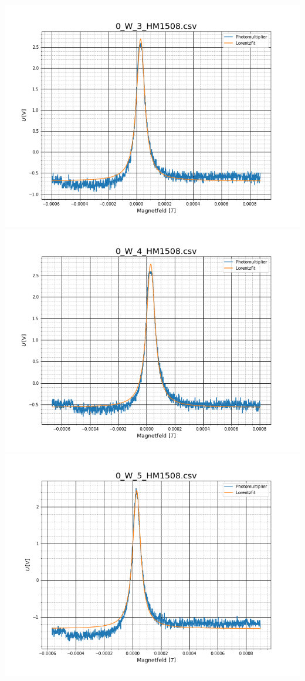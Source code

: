 \includegraphics[scale=0.3]{Bild/Anhang/Erwarmung/erw4}\\
\includegraphics[scale=0.3]{Bild/Anhang/Erwarmung/erw5}
\includegraphics[scale=0.3]{Bild/Anhang/Erwarmung/erw6}\\
